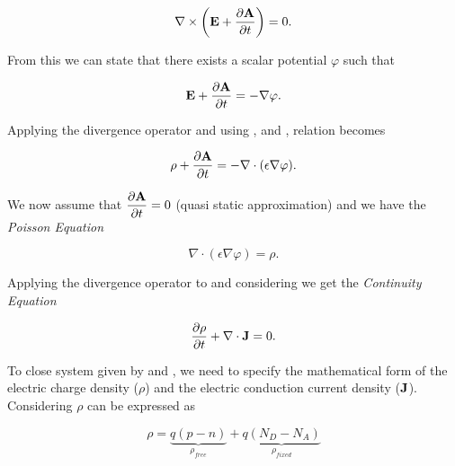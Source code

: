 \begin{equation}
\nabla \times \left( \mathbf{E} + \dfrac{\partial \mathbf{A}}{\partial t} \right) = 0.
\end{equation}

From this we can state that there exists a scalar potential $\varphi$ such that

\begin{equation}
\label{eq: potenziale scalare}
\mathbf{E} + \dfrac{\partial \mathbf{A}}{\partial t} = -\nabla \varphi.
\end{equation}


 Applying the divergence operator and using ,  and , relation  becomes

\begin{equation}
\rho + \dfrac{\partial \mathbf{A}}{\partial t}  = -\nabla \cdot (\epsilon \nabla \varphi).
\end{equation}

We now assume that $\dfrac{\partial \mathbf{A}}{\partial t} = 0$ (quasi static approximation) and we have the \textit{Poisson Equation}

\begin{equation}
\label{eq: Poisson equation}
\nabla \cdot (\epsilon \nabla \varphi) = \rho.
\end{equation} 
	
Applying the divergence operator to  and considering  we get the \textit{Continuity Equation}

\begin{equation}
\label{eq: continuity equation total}
\dfrac{\partial \rho}{\partial t} + \nabla \cdot \mathbf{J}  =  0. \end{equation} 


To close system  given by  and , we need to specify the mathematical form of the electric charge density ($\rho$) and the electric conduction current density ($\mathbf{J}$).
Considering  $\rho$ can be expressed as


\begin{equation}
\label{eq: charge balance}
\rho = \underbrace{q(p-n)}_{\rho_{free}} +\underbrace{q(N_D-N_A)}_{\rho_{fixed}}
\end{equation}

